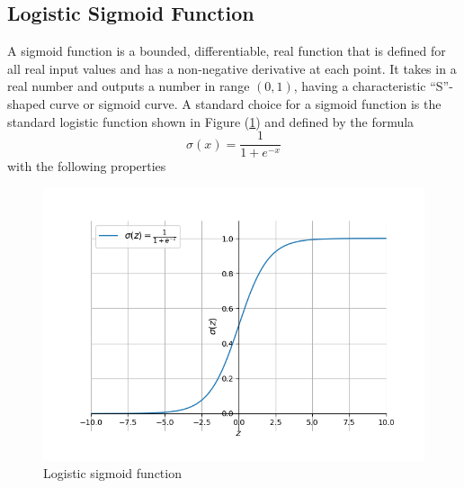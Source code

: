 \documentclass[12pt]{report}
\numberwithin{equation}{section}
\begin{document}
\subsection{Logistic Sigmoid Function}\label{sub:lsf}
A sigmoid function is a bounded, differentiable, real function that is defined for all real input values and has a non-negative derivative at each point. It takes in a real number and outputs a number in range $(0,1)$, having a characteristic ``S''-shaped curve or sigmoid curve. A standard choice for a sigmoid function is the standard logistic function shown in Figure (\ref{fig:sig}) and defined by the formula
\begin{equation}\label{eqn:sigma}
 \sigma(x) = \dfrac{1}{1+e^{-x}}
\end{equation}
with the following properties 
\begin{figure}[htb!]
\centering 
\includegraphics[scale=0.91]{png/sigmoid.png} 
\caption{Logistic sigmoid function}
\label{fig:sig}
\end{figure}
\end{document}
